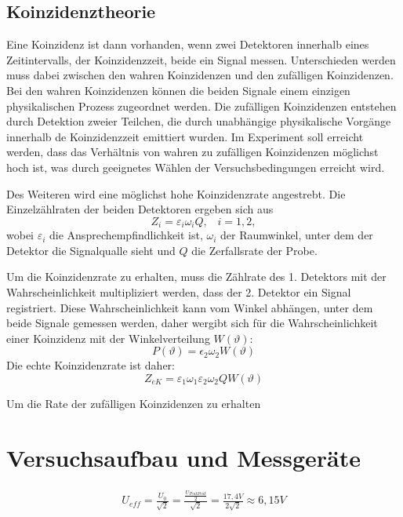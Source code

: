 \documentclass[11pt]{scrartcl}
\begin{document}
\subsection{Koinzidenztheorie}
Eine Koinzidenz ist dann vorhanden, wenn zwei Detektoren
innerhalb eines Zeitintervalls, der Koinzidenzzeit, beide ein 
Signal messen. Unterschieden werden muss dabei zwischen den 
wahren Koinzidenzen und den zufälligen Koinzidenzen. Bei den wahren
Koinzidenzen können die beiden Signale einem einzigen physikalischen
Prozess zugeordnet werden. Die zufälligen Koinzidenzen entstehen
durch Detektion zweier Teilchen, die durch unabhängige physikalische
Vorgänge innerhalb de Koinzidenzzeit emittiert wurden. Im Experiment
soll erreicht werden, dass das Verhältnis von wahren zu zufälligen 
Koinzidenzen möglichst hoch ist, was durch geeignetes Wählen der 
Versuchsbedingungen erreicht wird.

Des Weiteren wird eine möglichst hohe Koinzidenzrate angestrebt. 
Die Einzelzählraten der beiden Detektoren ergeben sich aus
\begin{equation}
 Z_i=\varepsilon_i \omega_i Q, \;\;\; i=1,2,
\end{equation}
wobei $\varepsilon_i$ die Ansprechempfindlichkeit ist, $\omega_i$
der Raumwinkel, unter dem der Detektor die Signalqualle sieht und
$Q$ die Zerfallsrate der Probe. 

Um die Koinzidenzrate zu erhalten, muss die Zählrate des 1. Detektors
mit der Wahrscheinlichkeit multipliziert werden, dass der 2. 
Detektor ein Signal registriert. Diese Wahrscheinlichkeit kann 
vom Winkel abhängen, unter dem beide Signale gemessen werden, daher
wergibt sich für die Wahrscheinlichkeit einer Koinzidenz mit der 
Winkelverteilung $W(\vartheta)$:
\begin{equation}
 P(\vartheta)=\epsilon_2\omega_2 W(\vartheta)
\end{equation}
Die echte Koinzidenzrate ist daher:
\begin{equation}
 Z_{eK}=\varepsilon_1 \omega_1 \varepsilon_2 \omega_2 Q W(\vartheta)
\end{equation}

Um die Rate der zufälligen Koinzidenzen zu erhalten 

\section{Versuchsaufbau und Messgeräte}

\begin{align}
U_{eff} = \frac{U_0}{\sqrt{2}} = \frac{\frac{U_{PeakPeak}}{2}}{\sqrt{2}} = \frac{17,4 V}{ 2 \sqrt{2}} \approx 6,15 V
\end{align}
\end{document}
